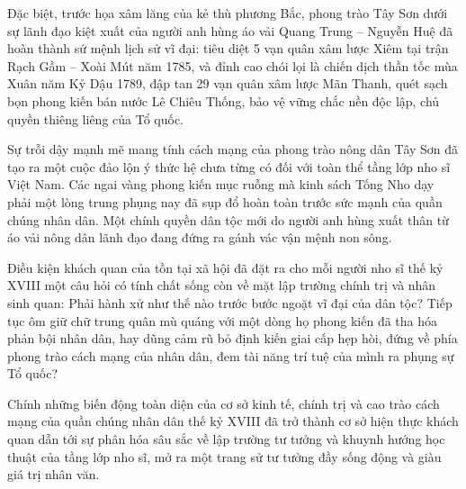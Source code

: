 Đặc biệt, trước họa xâm lăng của kẻ thù phương Bắc, phong trào Tây Sơn dưới sự lãnh đạo kiệt xuất của người anh hùng áo vải Quang Trung -- Nguyễn Huệ đã hoàn thành sứ mệnh lịch sử vĩ đại: tiêu diệt 5 vạn quân xâm lược Xiêm tại trận Rạch Gầm -- Xoài Mút năm 1785, và đỉnh cao chói lọi là chiến dịch thần tốc mùa Xuân năm Kỷ Dậu 1789, đập tan 29 vạn quân xâm lược Mãn Thanh, quét sạch bọn phong kiến bán nước Lê Chiêu Thống, bảo vệ vững chắc nền độc lập, chủ quyền thiêng liêng của Tổ quốc.

Sự trỗi dậy mạnh mẽ mang tính cách mạng của phong trào nông dân Tây Sơn đã tạo ra một cuộc đảo lộn ý thức hệ chưa từng có đối với toàn thể tầng lớp nho sĩ Việt Nam. Các ngai vàng phong kiến mục ruỗng mà kinh sách Tống Nho dạy phải một lòng trung phụng nay đã sụp đổ hoàn toàn trước sức mạnh của quần chúng nhân dân. Một chính quyền dân tộc mới do người anh hùng xuất thân từ áo vải nông dân lãnh đạo đang đứng ra gánh vác vận mệnh non sông.

Điều kiện khách quan của tồn tại xã hội đã đặt ra cho mỗi người nho sĩ thế kỷ XVIII một câu hỏi có tính chất sống còn về mặt lập trường chính trị và nhân sinh quan: Phải hành xử như thế nào trước bước ngoặt vĩ đại của dân tộc? Tiếp tục ôm giữ chữ trung quân mù quáng với một dòng họ phong kiến đã tha hóa phản bội nhân dân, hay dũng cảm rũ bỏ định kiến giai cấp hẹp hòi, đứng về phía phong trào cách mạng của nhân dân, đem tài năng trí tuệ của mình ra phụng sự Tổ quốc?

Chính những biến động toàn diện của cơ sở kinh tế, chính trị và cao trào cách mạng của quần chúng nhân dân thế kỷ XVIII đã trở thành cơ sở hiện thực khách quan dẫn tới sự phân hóa sâu sắc về lập trường tư tưởng và khuynh hướng học thuật của tầng lớp nho sĩ, mở ra một trang sử tư tưởng đầy sống động và giàu giá trị nhân văn.

